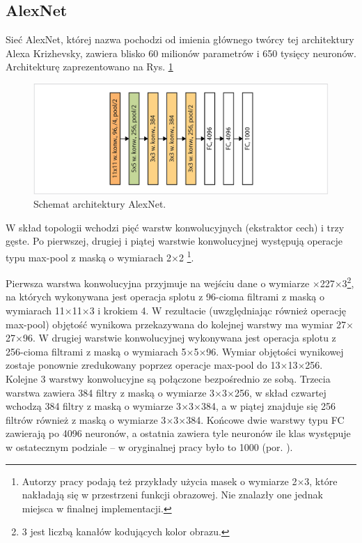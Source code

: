 \subsection{AlexNet}
\label{AlexNet}
Sieć AlexNet, której nazwa pochodzi od imienia głównego twórcy tej architektury Alexa Krizhevsky, zawiera blisko 60 milionów parametrów i 650 tysięcy neuronów. Architekturę zaprezentowano na Rys. \ref{AlexNetTopology}
\begin{figure}[h!]
	\centering
	\includegraphics[width=1\textwidth]{figures/AlexNet.png}
	\caption{Schemat architektury AlexNet.}
	\label{AlexNetTopology}
\end{figure}

W skład topologii wchodzi pięć warstw konwolucyjnych (ekstraktor cech) i trzy gęste. Po pierwszej, drugiej i piątej warstwie konwolucyjnej występują operacje typu max-pool z maską o wymiarach 2$\times$2 \footnote{Autorzy pracy podają też przykłady użycia masek o wymiarze 2$\times$3, które nakładają się \linebreak w przestrzeni funkcji obrazowej. Nie znalazły one jednak miejsca w finalnej implementacji.}. 

Pierwsza warstwa konwolucyjna przyjmuje na wejściu dane o wymiarze $\times$227$\times$3\footnote{3 jest liczbą kanałów kodujących kolor obrazu.}, na których wykonywana jest operacja splotu z 96-cioma filtrami \linebreak z maską o wymiarach 11$\times$11$\times$3 i krokiem 4. W rezultacie (uwzględniając również operację max-pool) objętość wynikowa przekazywana do kolejnej warstwy ma wymiar 27$\times$27$\times$96. W drugiej warstwie konwolucyjnej wykonywana jest operacja splotu z 256-cioma filtrami z maską o wymiarach 5$\times$5$\times$96. Wymiar objętości wynikowej zostaje ponownie zredukowany poprzez operacje max-pool do 13$\times$13$\times$256. Kolejne 3 warstwy konwolucyjne są połączone bezpośrednio ze sobą. Trzecia warstwa zawiera 384 filtry z maską o wymiarze 3$\times$3$\times$256, w skład czwartej wchodzą 384 filtry \linebreak z maską o wymiarze 3$\times$3$\times$384, a w piątej znajduje się 256 filtrów również z maską \linebreak o wymiarze 3$\times$3$\times$384. Końcowe dwie warstwy typu FC zawierają po 4096 neuronów, a ostatnia zawiera tyle neuronów ile klas występuje w ostatecznym podziale -- w oryginalnej pracy było to 1000 (por. \cite{Krizhevsky2012}).

